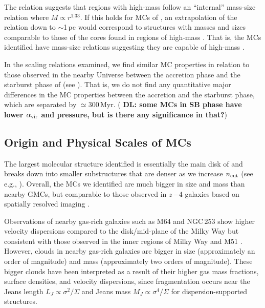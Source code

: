\IfFileExists{emulateapjlegacy.cls}{\documentclass[iop]{emulateapjlegacy}}{\documentclass[iop]{emulateapj}}
\newcommand{\DL}[1]{({\bf \color{dlcolor} DL: #1})}
\begin{document}
The \citet{Kauffmann10c} relation suggests that regions with high-mass \SF follow 
an ``internal'' mass-size relation where $M\propto r^{1.33}$.
If this holds for MCs of \flower, an extrapolation of the \citet{Kauffmann10c} relation down to $\sim$1\,pc would correspond to structures with masses and sizes comparable to those of the cores found in
regions of high-mass \SF. That is, the MCs identified have mass-size relations suggesting they are capable of high-mass \SF. 

In the scaling relations examined, we find similar MC properties in relation to those observed in the nearby Universe between the accretion phase and the starburst phase of \flower (see ). That is, we do not find any quantitative major differences in the MC properties between the accretion and the starburst phase, which are separated by $\simeq$300\,Myr. \DL{some MCs in SB phase have
lower $\alpha_{\rm vir}$ and pressure, but 
is there any significance in that?}

\subsection{Origin and Physical Scales of MCs} \label{sec:origin}

The largest molecular structure identified is essentially the main disk of \flower and breaks down into smaller substructures that are denser as we increase $n_{\rm cut}$ (see e.g., ). Overall, the MCs we identified are much bigger in size and mass than nearby GMCs, but comparable to those observed in $z$\,$-$4 galaxies based on spatially resolved imaging \citep{Swinbank11a}.

Observations of nearby gas-rich galaxies such as M64 and NGC\,253 show higher velocity dispersions compared to the disk/mid-plane of the Milky Way but consistent with those observed in the inner regions of Milky Way and M51 \citep{Oka01a, Rosolowsky05a, Heyer09a, Hughes13b, Leroy15a, Rice16a}.  %
However, clouds in nearby gas-rich galaxies are bigger in size (approximately an order of magnitude) and mass (approximately two orders of magnitude).
These bigger clouds have been interpreted as a result of their higher gas mass fractions, surface densities, and velocity dispersions,
since fragmentation occurs near the Jeans length $L_J\propto\sigma^2/\Sigma$ and
Jeans mass $M_J\propto\sigma^4/\Sigma$ for dispersion-supported structures.
\end{document}
